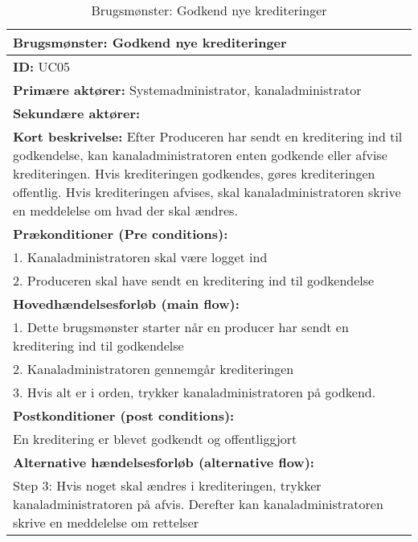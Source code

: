 \begin{table}[ht]
    \begin{tabularx}{\textwidth}{|X|}
            \hline
            \textbf{Brugsmønster:}  Godkend nye krediteringer \\ 
            \hline
        	\textbf{ID:} UC05 \\ 
        	\hline
        	\textbf{Primære aktører:} Systemadministrator, kanaladministrator \\ \hline
        	\textbf{Sekundære aktører:} \\ \hline
        	\textbf{Kort beskrivelse:} Efter Produceren har sendt en kreditering ind til godkendelse, kan kanaladministratoren enten godkende eller afvise krediteringen. Hvis krediteringen godkendes, gøres krediteringen offentlig. Hvis krediteringen afvises, skal kanaladministratoren skrive en meddelelse om hvad der skal ændres. \\ \hline
        	\textbf{Prækonditioner (Pre conditions):} \\
        	1. Kanaladministratoren skal være logget ind \\ 
        	2. Produceren skal have sendt en kreditering ind til godkendelse \\
        	\hline
        \textbf{Hovedhændelsesforløb (main flow):} \\
        1. Dette brugsmønster starter når en producer har sendt en kreditering ind til godkendelse \\ 
        2. Kanaladministratoren gennemgår krediteringen \\ 
        3. Hvis alt er i orden, trykker kanaladministratoren på godkend.\\ \hline
        \textbf{Postkonditioner (post conditions):} \\
            En kreditering er blevet godkendt og offentliggjort \\ \hline
        \textbf{Alternative hændelsesforløb (alternative flow):} \\
        Step 3: Hvis noget skal ændres i krediteringen, trykker kanaladministratoren på afvis. Derefter kan kanaladministratoren skrive en meddelelse om rettelser \\
        \hline
    \end{tabularx}
    \caption{Brugsmønster: Godkend nye krediteringer}
    \label{table:approve_credit}
\end{table}



